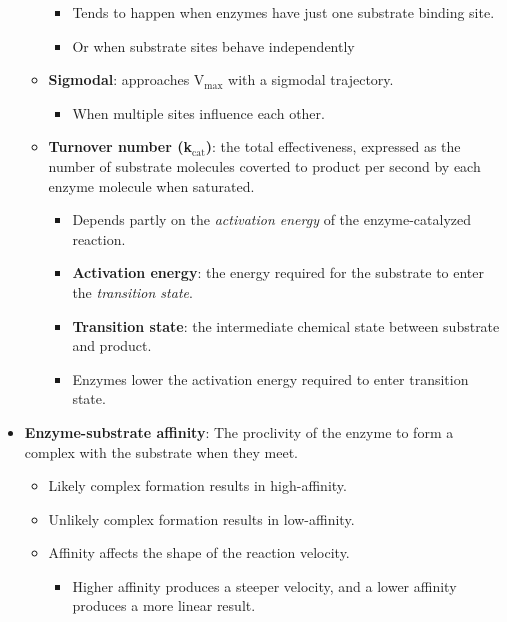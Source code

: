 \documentclass[12pt,a4paper]{article}
\begin{document}
\begin{itemize}
\begin{itemize}
\begin{itemize}
                    \item Tends to happen when enzymes have just one substrate binding site.
                    \item Or when substrate sites behave independently
                \end{itemize}
            \item \textbf{Sigmodal}: approaches V\(_{\text{max}}\) with a sigmodal trajectory.
                \begin{itemize}
                    \item When multiple sites influence each other.
                \end{itemize}
            \item \textbf{Turnover number (k\(_{\text{cat}}\))}: the {\color{o-Sun}total effectiveness}, expressed as the number of substrate molecules coverted to product per second by each enzyme molecule when saturated.
                \begin{itemize}
                    \item Depends partly on the \textit{activation energy} of the enzyme-catalyzed reaction.
                    \item \textbf{Activation energy}: the energy required for the substrate to enter the \textit{transition state}. 
                    \item \textbf{Transition state}: the intermediate chemical state between substrate and product.
                    \item Enzymes {\color{o-Sun}lower the activation energy} required to enter transition state.
                \end{itemize}
        \end{itemize}
    \item \textbf{Enzyme-substrate affinity}: The proclivity of the enzyme to form a complex with the substrate when they meet.
        \begin{itemize}
            \item {\color{pos}Likely} complex formation results in {\color{pos}high-affinity}.
            \item {\color{neg}Unlikely} complex formation results in {\color{neg}low-affinity}.
            \item Affinity affects the shape of the reaction velocity.
                \begin{itemize}
                    \item {\color{pos}Higher} affinity produces a {\color{pos}steeper} velocity, and a {\color{neg}lower} affinity produces a more {\color{neg}linear} result.

\end{itemize}
\end{itemize}
\end{itemize}
\end{document}
